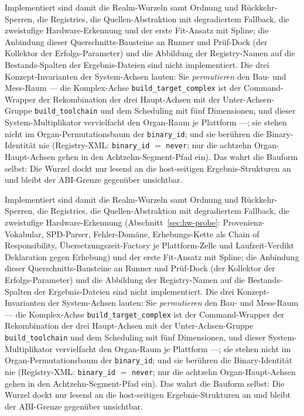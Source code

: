 \begin{nurlang}
Implementiert sind damit die Realm-Wurzeln samt Ordnung und Rückkehr-Sperren, die Registries, die
Quellen-Abstraktion mit degradiertem Fallback, die zweistufige Hardware-Erkennung und der erste Fit-Ansatz mit
Spline; die Anbindung dieser Querschnitts-Bausteine an Runner und Prüf-Dock (der Kollektor der
Erfolgs-Parameter) und die Abbildung der Registry-Namen auf die Bestands-Spalten der Ergebnis-Dateien
sind nicht implementiert. Die drei Konzept-Invarianten der System-Achsen lauten: Sie
\emph{permutieren} den Bau- und Mess-Raum --- die Komplex-Achse \texttt{build\_target\_complex} ist der
Command-Wrapper der Rekombination der drei Haupt-Achsen mit der Unter-Achsen-Gruppe
\texttt{build\_toolchain} und dem Scheduling mit fünf Dimensionen, und dieser System-Multiplikator
vervielfacht den Organ-Raum je Plattform ---; sie stehen nicht im Organ-Permutationsbaum der
\texttt{binary\_id}; und sie berühren die Binary-Identität nie (Registry-XML\@: \texttt{binary\_id} $=$
\texttt{never}; nur die achtzehn Organ-Haupt-Achsen gehen in den Achtzehn-Segment-Pfad ein). Das wahrt
die Bauform selbst: Die Wurzel dockt nur lesend an die host-seitigen Ergebnis-Strukturen an und bleibt
der ABI-Grenze gegenüber unsichtbar.
\end{nurlang}
\begin{nurkurz}
Implementiert sind damit die Realm-Wurzeln samt Ordnung und Rückkehr-Sperren, die Registries, die
Quellen-Abstraktion mit degradiertem Fallback, die zweistufige Hardware-Erkennung
(Abschnitt~\ref{sec:hw-probe}: Provenienz-Vokabular, SPD-Parser, Fehler-Domäne, Erhebungs-Kette als Chain
of Responsibility, Übersetzungszeit-Factory je Plattform-Zelle und Laufzeit-Verdikt Deklaration gegen
Erhebung) und der erste Fit-Ansatz mit Spline; die Anbindung dieser Querschnitts-Bausteine an Runner und
Prüf-Dock (der Kollektor der Erfolgs-Parameter) und die Abbildung der Registry-Namen auf die
Bestands-Spalten der Ergebnis-Dateien sind nicht implementiert. Die drei Konzept-Invarianten der
System-Achsen lauten: Sie \emph{permutieren} den Bau- und Mess-Raum --- die Komplex-Achse
\texttt{build\_target\_complex} ist der Command-Wrapper der Rekombination der drei Haupt-Achsen mit der
Unter-Achsen-Gruppe \texttt{build\_toolchain} und dem Scheduling mit fünf Dimensionen, und dieser
System-Multiplikator vervielfacht den Organ-Raum je Plattform ---; sie stehen nicht im
Organ-Permutationsbaum der \texttt{binary\_id}; und sie berühren die Binary-Identität nie
(Registry-XML\@: \texttt{binary\_id} $=$ \texttt{never}; nur die achtzehn Organ-Haupt-Achsen gehen in den
Achtzehn-Segment-Pfad ein). Das wahrt die Bauform selbst: Die Wurzel dockt nur lesend an die host-seitigen
Ergebnis-Strukturen an und bleibt der ABI-Grenze gegenüber unsichtbar.
\end{nurkurz}

